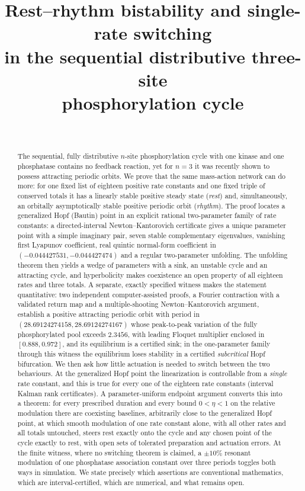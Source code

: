 \documentclass[11pt,a4paper]{article}
\title{Rest--rhythm bistability and single-rate switching\\ in the sequential distributive three-site\\ phosphorylation cycle}
\author{\PaperAuthor\\[2pt]\small\PaperAffiliation}
\date{\PaperDate}
\theoremstyle{plain}
\theoremstyle{definition}
\theoremstyle{remark}
\begin{document}
\maketitle

\begin{abstract}
The sequential, fully distributive $n$-site phosphorylation cycle with one kinase and one phosphatase contains no feedback reaction, yet for $n=3$ it was recently shown to possess attracting periodic orbits. We prove that the same mass-action network can do more: for one fixed list of eighteen positive rate constants and one fixed triple of conserved totals it has a linearly stable positive steady state (\emph{rest}) and, simultaneously, an orbitally asymptotically stable positive periodic orbit (\emph{rhythm}). The proof locates a generalized Hopf (Bautin) point in an explicit rational two-parameter family of rate constants: a directed-interval Newton--Kantorovich certificate gives a unique parameter point with a simple imaginary pair, seven stable complementary eigenvalues, vanishing first Lyapunov coefficient, real quintic normal-form coefficient in $(-0.044427531,-0.044427474)$ and a regular two-parameter unfolding. The unfolding theorem then yields a wedge of parameters with a sink, an unstable cycle and an attracting cycle, and hyperbolicity makes coexistence an open property of all eighteen rates and three totals. A separate, exactly specified witness makes the statement quantitative: two independent computer-assisted proofs, a Fourier contraction with a validated return map and a multiple-shooting Newton--Kantorovich argument, establish a positive attracting periodic orbit with period in $(28.69124274158,28.69124274167)$ whose peak-to-peak variation of the fully phosphorylated pool exceeds $2.3456$, with leading Floquet multiplier enclosed in $[0.888,0.972]$, and its equilibrium is a certified sink; in the one-parameter family through this witness the equilibrium loses stability in a certified \emph{subcritical} Hopf bifurcation. We then ask how little actuation is needed to switch between the two behaviours. At the generalized Hopf point the linearization is controllable from a \emph{single} rate constant, and this is true for every one of the eighteen rate constants (interval Kalman rank certificates). A parameter-uniform endpoint argument converts this into a theorem: for every prescribed duration and every bound $0<\eta<1$ on the relative modulation there are coexisting baselines, arbitrarily close to the generalized Hopf point, at which smooth modulation of one rate constant alone, with all other rates and all totals untouched, steers rest exactly onto the cycle and any chosen point of the cycle exactly to rest, with open sets of tolerated preparation and actuation errors. At the finite witness, where no switching theorem is claimed, a $\pm10\%$ resonant modulation of one phosphatase association constant over three periods toggles both ways in simulation. We state precisely which assertions are conventional mathematics, which are interval-certified, which are numerical, and what remains open.
\end{abstract}
\end{document}
